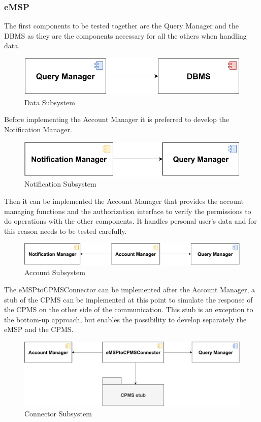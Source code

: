 \subsubsection{eMSP}
The first components to be tested together are the Query Manager and the DBMS as they are the components necessary for all the others when handling data.
\begin{figure}[H]
    \centering
    \includegraphics[scale=0.6]{src/Integration/eMSP_Query.pdf}
    \caption{Data Subsystem}
\end{figure}
Before implementing the Account Manager it is preferred to develop the Notification Manager.
\begin{figure}[H]
    \centering
    \includegraphics[scale=0.6]{src/Integration/eMSP_Notification.pdf}
    \caption{Notification Subsystem}
\end{figure}
Then it can be implemented the Account Manager that provides the account managing functions and the authorization interface 
to verify the permissions to do operations with the other components. It handles personal user's data and for this reason needs
to be tested carefully.
\begin{figure}[H]
    \centering
    \includegraphics[scale=0.6]{src/Integration/eMSP_Account.pdf}
    \caption{Account Subsystem}
\end{figure}
The eMSPtoCPMSConnector can be implemented after the Account Manager, a stub of the CPMS can be implemented at this point to simulate
the response of the CPMS on the other side of the communication. This stub is an exception to the bottom-up approach, but
enables the possibility to develop separately the eMSP and the CPMS.
\begin{figure}[H]
    \centering
    \includegraphics[scale=0.6]{src/Integration/eMSP_Connector.pdf}
    \caption{Connector Subsystem}
\end{figure}
